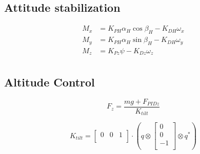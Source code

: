 \documentclass{article}
\numberwithin{equation}{section} %
\begin{document}
\subsection{Attitude stabilization}

\begin{align}
	M_x &= K_{PH} \alpha_H \cos \beta_H - K_{DH} \omega_x \\
	M_y &= K_{PH} \alpha_H \sin \beta_H - K_{DH} \omega_y \\
	M_z &= K_{Pz} \psi - K_{Dz} \omega_z \\
\end{align}

\subsection{Altitude Control}

\begin{equation}
	F_z = \frac{mg + F_{PIDz}} {K_{tilt}}
\end{equation}

\begin{equation}
	K_{tilt} = 
	\begin{bmatrix}
		0 & 0 & 1 \\	
	\end{bmatrix}
	\cdot
	\left(
		q \otimes
			\begin{bmatrix}
				0 \\
				0 \\
				-1 \\
			\end{bmatrix}
		\otimes q^*
	\right)
\end{equation}
\end{document}
